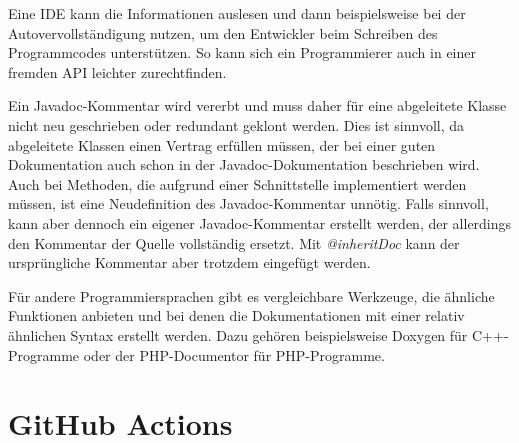 Eine \ac{IDE} kann die Informationen auslesen und dann beispielsweise bei der Autovervollständigung nutzen, um den Entwickler beim Schreiben des Programmcodes unterstützen. So kann sich ein Programmierer auch in einer fremden \ac{API} leichter zurechtfinden.

Ein Javadoc-Kommentar wird vererbt und muss daher für eine abgeleitete Klasse nicht neu geschrieben oder redundant geklont werden. Dies ist sinnvoll, da abgeleitete Klassen einen Vertrag erfüllen müssen, der bei einer guten Dokumentation auch schon in der Javadoc-Dokumentation beschrieben wird. Auch bei Methoden, die aufgrund einer Schnittstelle implementiert werden müssen, ist eine Neudefinition des Javadoc-Kommentar unnötig. Falls sinnvoll, kann aber dennoch ein eigener Javadoc-Kommentar erstellt werden, der allerdings den Kommentar der Quelle vollständig ersetzt. Mit \textit{@inheritDoc} kann der ursprüngliche Kommentar aber trotzdem eingefügt werden.

Für andere Programmiersprachen gibt es vergleichbare Werkzeuge, die ähnliche Funktionen anbieten und bei denen die Dokumentationen mit einer relativ ähnlichen Syntax erstellt werden. Dazu gehören beispielsweise Doxygen für C++-Programme oder der PHP-Documentor für PHP-Programme. 

\section{GitHub Actions}\label{chapter:github_actions}
